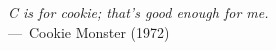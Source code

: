\vspace*{\fill}

\begin{epigraph}
    \emph{C is for cookie; that's good enough for me.} \\---~Cookie Monster (1972)
\end{epigraph}

\vspace*{\fill}

